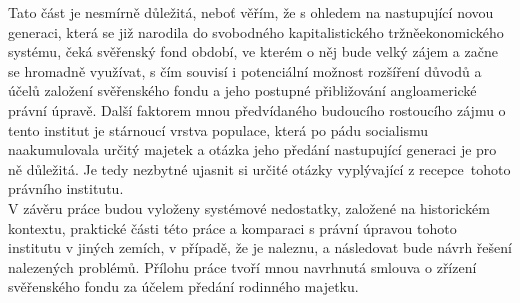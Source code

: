 \documentclass{article}
\begin{document}
\indent Tato část je nesmírně důležitá, neboť věřím, že s ohledem na nastupující novou generaci, která se již narodila do svobodného kapitalistického tržněeko\-nomického systému, čeká svěřenský fond období, ve kterém o něj bude velký zájem a začne se hromadně využívat, s čím souvisí i potenciální možnost rozšíření důvodů a účelů založení svěřenského fondu a jeho postupné přibližování angloamerické právní úpravě. Další faktorem mnou předvídaného budoucího rostoucího zájmu o tento institut je stárnoucí vrstva populace, která po pádu soci\-alismu naakumulovala určitý majetek a otázka jeho předání nastupující generaci je pro ně důležitá. Je tedy nezbytné ujasnit si určité otázky vyplývající z recepce\ tohoto právního institutu. \\

\indent V závěru práce budou vyloženy systémové nedostatky, založené na historickém kontextu, praktické části této práce a komparaci s právní úpravou tohoto institutu v jiných zemích, v případě, že je naleznu, a následovat bude návrh řešení nalezených problémů. Přílohu práce tvoří mnou navrhnutá smlouva o zřízení svěřenského fondu za účelem předání rodinného majetku.




\end{document}
